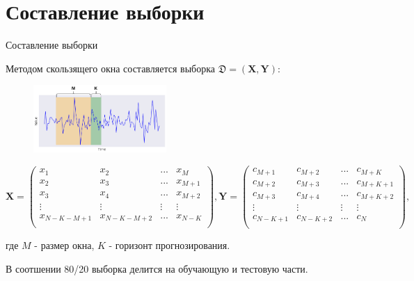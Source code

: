 \documentclass[10pt,pdf,hyperref={unicode}]{beamer}
\begin{document}
\section{Составление выборки}
\begin{frame}{Составление выборки}

Методом скользящего окна составляется выборка $\mathfrak{D}=(\mathbf{X},\mathbf{Y})$:

\begin{figure}[h!t]\center
{\includegraphics[width=0.45\textwidth]{results/slidingwindow.png}}
\end{figure}

\small
\[
\mathbf{X} = 
\begin{pmatrix}
x_{1} & x_{2} & ... & x_{M}\\
x_{2} & x_{3} & ... & x_{M+1} \\
x_{3} & x_{4} & ... & x_{M+2} \\
\vdots & \vdots & \vdots & \vdots \\
x_{N-K-M+1} & x_{N-K-M+2} & ... & x_{N-K} \\
\end{pmatrix},
\mathbf{Y} = \begin{pmatrix}
c_{M+1} & c_{M+2} & ... & c_{M+K}\\
c_{M+2} & c_{M+3} & ... & c_{M+K+1} \\
c_{M+3} & c_{M+4} & ... & c_{M+K+2} \\
\vdots & \vdots & \vdots & \vdots \\
c_{N-K+1} & c_{N-K+2} & ... & c_{N} \\
\end{pmatrix},
\]
\normalsize

где  $M$ - размер окна, $K$ - горизонт прогнозирования.

\bigskip

В соотшении 80/20 выборка делится на обучающую и тестовую части.

\end{frame}
\end{document}

